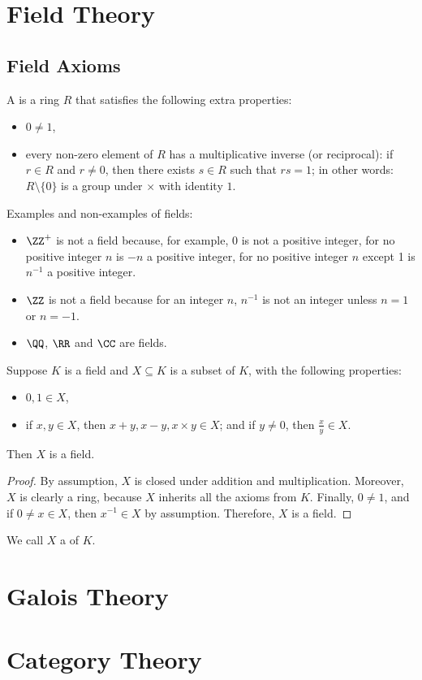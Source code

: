 \chapter{Field Theory}
\section{Field Axioms}
\begin{definition}
A  is a ring $R$ that satisfies the following extra properties:
\begin{itemize}
\item $0 \neq 1$,
\item every non-zero element of $R$ has a multiplicative inverse (or reciprocal): if $r \in R$ and $r \neq 0$, then there exists $s \in R$ such that $rs=1$; in other words: $R \setminus\{0\}$ is a group under $\times$ with identity $1$.
\end{itemize}
\end{definition}

\begin{example}
Examples and non-examples of fields:
\begin{itemize}
\item $\ZZ^+$ is not a field because, for example, $0$ is not a positive integer, for no positive integer $n$ is $-n$ a positive integer, for no positive integer $n$ except 1 is $n^{-1}$ a positive integer.
\item $\ZZ$ is not a field because for an integer $n$, $n^{-1}$ is not an integer unless $n=1$ or $n=-1$.
\item $\QQ$, $\RR$ and $\CC$ are fields.
\end{itemize}
\end{example}

\begin{proposition}
Suppose $K$ is a field and $X \subseteq K$ is a subset of $K$, with the following properties:
\begin{itemize}
\item $0, 1 \in X$,
\item if $x, y \in X$, then $x+y, x-y, x \times y \in X$; and if $y \neq 0$, then $\frac{x}{y} \in X$.
\end{itemize}
Then $X$ is a field.
\end{proposition}
\begin{proof}
By assumption, $X$ is closed under addition and multiplication. Moreover, $X$ is clearly a ring, because $X$ inherits all the axioms from $K$. Finally, $0 \neq 1$, and if $0 \neq x \in X$, then $x^{-1} \in X$ by assumption. Therefore, $X$ is a field.
\end{proof}
We call $X$ a  of $K$.

\chapter{Galois Theory}

\chapter{Category Theory}
